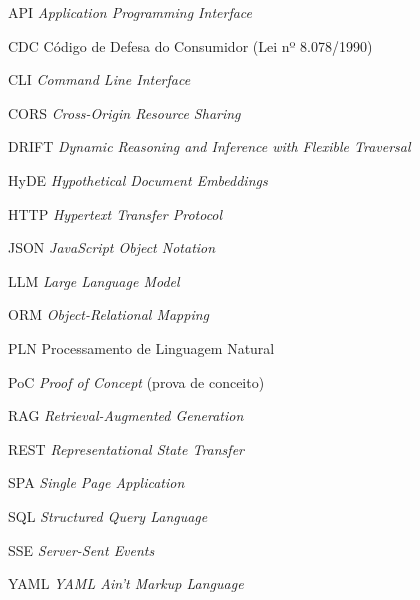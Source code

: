 \documentclass[
	12pt,				%
	openright,			%
	oneside,			%
	a4paper,			%
	english,			%
	french,				%
	spanish,			%
	brazil				%
	]{abntex2}
\begin{document}
\setlength{\absparsep}{18pt}
\begin{resumo}

\end{resumo}

\listoffigures*
\cleardoublepage

\listoftables*
\cleardoublepage

\begin{siglas}
  \item[API] \textit{Application Programming Interface}
  \item[CDC] Código de Defesa do Consumidor (Lei nº 8.078/1990)
  \item[CLI] \textit{Command Line Interface}
  \item[CORS] \textit{Cross-Origin Resource Sharing}
  \item[DRIFT] \textit{Dynamic Reasoning and Inference with Flexible Traversal}
  \item[HyDE] \textit{Hypothetical Document Embeddings}
  \item[HTTP] \textit{Hypertext Transfer Protocol}
  \item[JSON] \textit{JavaScript Object Notation}
  \item[LLM] \textit{Large Language Model}
  \item[ORM] \textit{Object-Relational Mapping}
  \item[PLN] Processamento de Linguagem Natural
  \item[PoC] \textit{Proof of Concept} (prova de conceito)
  \item[RAG] \textit{Retrieval-Augmented Generation}
  \item[REST] \textit{Representational State Transfer}
  \item[SPA] \textit{Single Page Application}
  \item[SQL] \textit{Structured Query Language}
  \item[SSE] \textit{Server-Sent Events}
  \item[YAML] \textit{YAML Ain't Markup Language}
\end{siglas}

\tableofcontents*
\cleardoublepage
\end{document}

